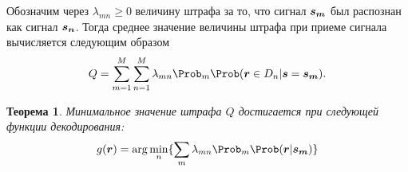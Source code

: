 \documentclass{book}
\newtheorem{theorem}{Теорема}
\numberwithin{theorem}{chapter}
\numberwithin{statement}{chapter}
\numberwithin{lemma}{chapter}
\theoremstyle{definition}
\numberwithin{task}{chapter}
\theoremstyle{remark}
\numberwithin{example}{chapter}
\theoremstyle{definition}
\numberwithin{definition}{chapter}
\theoremstyle{remark}
\theoremstyle{remark}
\numberwithin{lyrics}{section}
\begin{document}
Обозначим через $\lambda_{mn} \ge 0$ величину штрафа за то, что сигнал $\boldsymbol{s_m}$ был распознан как сигнал $\boldsymbol{s_n}$. Тогда среднее значение величины штрафа при приеме сигнала вычисляется следующим образом 
\begin{equation}
Q = \Sum_{m = 1}^M \Sum_{n = 1}^M \lambda_{mn} \Prob_m \Prob(\vec{r} \in D_n|\vec{s} = \vec{s_m}).
\end{equation}
\begin{theorem}
	\label{th:bayes}
	Минимальное значение штрафа $Q$ достигается при следующей функции декодирования:
	$$
	\decisionf{\makebold{r}} = \arg \min\limits_n \{\Sum_m \lambda_{mn}\Prob_m\Prob(\vec{r}|\vec{s_m})\}
	$$
\end{theorem}
\end{document}
